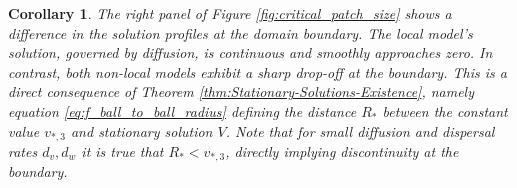 \documentclass[11pt, a4paper]{article}
\providecommand{\MT}[1]{\todo[inline,author={MT},color=blue!20!white]{#1}}
\theoremstyle{break}
\theoremstyle{break}
\theoremstyle{break}
\theoremstyle{break}
\theoremstyle{break}
\theoremstyle{break}
\newtheorem{cor}{Corollary}[section]
\theoremstyle{break}
\theoremstyle{break}
\theoremstyle{break}
\begin{document}
\begin{cor}
The right panel of Figure \ref{fig:critical_patch_size} shows a difference in the solution profiles at the domain boundary. The local model's solution, governed by diffusion, is continuous and smoothly approaches zero. In contrast, both non-local models exhibit a sharp drop-off at the boundary. This is a direct consequence of Theorem \ref{thm:Stationary-Solutions-Existence}, namely equation \eqref{eq:f_ball_to_ball_radius} defining the distance $R_*$ between the constant value $v_{*, 3}$ and stationary solution $V$. Note that for small diffusion and dispersal rates $d_v, d_w$ it is true that $R_* < v_{*, 3}$, directly implying discontinuity at the boundary.
\end{cor}


\end{document}
